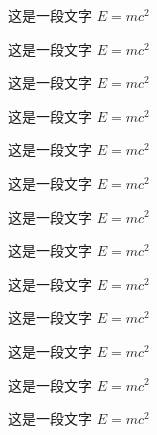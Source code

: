 \documentclass{xdyy-usermanual}
\begin{document}
\begin{vexample}
    \begin{definition}
      这是一段文字 $E = m c^2$
    \end{definition}
    
    \begin{theorem}
      这是一段文字 $E = m c^2$
    \end{theorem}
    
    \begin{example}
      这是一段文字 $E = m c^2$
    \end{example}
    
    \begin{property}
      这是一段文字 $E = m c^2$
    \end{property}
    
    \begin{proposition}
      这是一段文字 $E = m c^2$
    \end{proposition}
\end{vexample}

\begin{vexample}
    \begin{corollary}
      这是一段文字 $E = m c^2$
    \end{corollary}
    
    \begin{lemma}
      这是一段文字 $E = m c^2$
    \end{lemma}
    
    \begin{axiom}
      这是一段文字 $E = m c^2$
    \end{axiom}
    
    \begin{antiexample}
      这是一段文字 $E = m c^2$
    \end{antiexample}
\end{vexample}

\begin{vexample}
    \begin{remark}
      这是一段文字 $E = m c^2$
    \end{remark}
    
    \begin{hint}
      这是一段文字 $E = m c^2$
    \end{hint}
    
    \begin{summary}
      这是一段文字 $E = m c^2$
    \end{summary}

    \begin{analysis}
      这是一段文字 $E = m c^2$
    \end{analysis}
\end{vexample}
\end{document}
